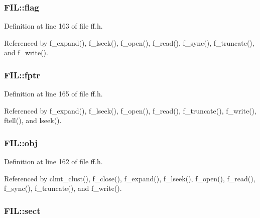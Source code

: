 \subsubsection[{\texorpdfstring{flag}{flag}}]{ F\+I\+L\+::flag}\hypertarget{structFIL_ac409508881f5a16f2998ae675072b376}{}\label{structFIL_ac409508881f5a16f2998ae675072b376}


Definition at line 163 of file ff.\+h.



Referenced by f\+\_\+expand(), f\+\_\+lseek(), f\+\_\+open(), f\+\_\+read(), f\+\_\+sync(), f\+\_\+truncate(), and f\+\_\+write().

\subsubsection[{\texorpdfstring{fptr}{fptr}}]{ F\+I\+L\+::fptr}\hypertarget{structFIL_a088b03ab2e02f82e10e17bdd938190a6}{}\label{structFIL_a088b03ab2e02f82e10e17bdd938190a6}


Definition at line 165 of file ff.\+h.



Referenced by f\+\_\+expand(), f\+\_\+lseek(), f\+\_\+open(), f\+\_\+read(), f\+\_\+truncate(), f\+\_\+write(), ftell(), and lseek().

\subsubsection[{\texorpdfstring{obj}{obj}}]{ F\+I\+L\+::obj}\hypertarget{structFIL_ae7242545ea88ea2602484122ebe65fa3}{}\label{structFIL_ae7242545ea88ea2602484122ebe65fa3}


Definition at line 162 of file ff.\+h.



Referenced by clmt\+\_\+clust(), f\+\_\+close(), f\+\_\+expand(), f\+\_\+lseek(), f\+\_\+open(), f\+\_\+read(), f\+\_\+sync(), f\+\_\+truncate(), and f\+\_\+write().

\subsubsection[{\texorpdfstring{sect}{sect}}]{ F\+I\+L\+::sect}\hypertarget{structFIL_affec18b48fe716fdae6a60123fc61145}{}\label{structFIL_affec18b48fe716fdae6a60123fc61145}


